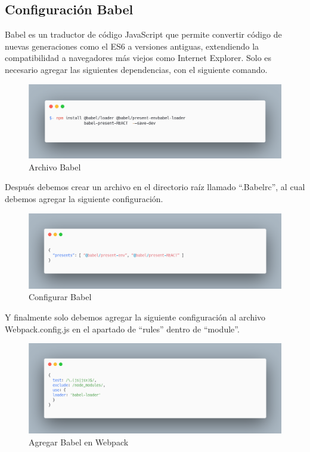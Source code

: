     \subsection{Configuración Babel}
    Babel es un traductor de código JavaScript que permite convertir código de nuevas generaciones como el ES6 a versiones antiguas, extendiendo la compatibilidad a navegadores más viejos como Internet Explorer.
    Solo es necesario agregar las siguientes dependencias, con el siguiente comando.
    \newline
    \newline
     \begin{figure}[H]
    \includegraphics[width=1\textwidth]{./Imagenes/image36.png}
     \caption[Archivo Babel]{Archivo Babel}
         \end{figure}
    \newline
    \newline
    Después debemos crear un archivo en el directorio raíz llamado “.Babelrc”, al cual debemos agregar la siguiente configuración.
    \newline
    \newline
     \begin{figure}[H]
    \includegraphics[width=1\textwidth]{./Imagenes/image17.png}
    \caption[Configurar Babel]{Configurar Babel}
    \end{figure}
    \newline
    \newline
    Y finalmente solo debemos agregar la siguiente configuración al archivo Webpack.config.js en el apartado de “rules” dentro de “module”.
    \newline
    \newline
     \begin{figure}[H]
    \includegraphics[width=1\textwidth]{./Imagenes/image1.png}
    \caption[Agregar Babel en Webpack]{Agregar Babel en Webpack}
    \end{figure}
